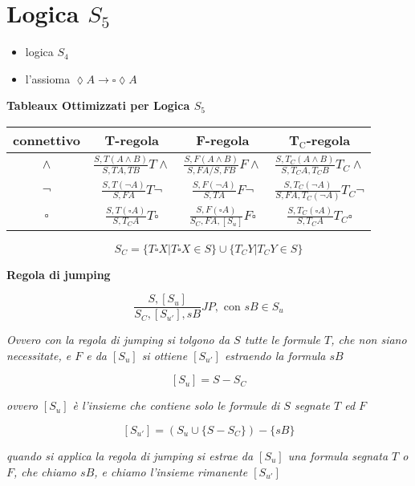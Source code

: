 \documentclass[a4paper,12pt, oneside]{book}
\begin{document}
\section*{Logica $S_5$}
\begin{itemize}
  \item logica $S_4$
  \item l'assioma $\lozenge A\to \square\lozenge A$
\end{itemize}
\begin{center}
  \textbf{Tableaux Ottimizzati per Logica $S_5$}
\end{center}
\begin{table}[H]
  \Large
  \centering
  \begin{tabular}{c||c|c|c}
    connettivo& T-regola& F-regola&T$_{\mbox{C}}$-regola\\
    \hline
    \hline
    $\land$ & $\frac{S,T(A\land B)}{S,TA,TB}T\land$&
                        $\frac{S,F(A\land B)}{S,FA/S,FB}F\land$&
                 $\frac{S,T_C(A\land B)}{S,T_CA,T_CB}T_C\land$\\
    \hline
    $\neg$ & $\frac{S,T(\neg A)}{S,FA}T\neg$&
                        $\frac{S,F(\neg A)}{S,TA}F\neg$&
         $\frac{S,T_C(\neg A)}{S,FA,T_C(\neg A)}T_C\neg$\\
    \hline
    $\square$ & $\frac{S,T(\square A)}{S,T_CA}T\square$&
             $\frac{S,F(\square A)}{S_C,FA,[S_u]}F\square$&
              $\frac{S,T_C(\square A)}{S,T_CA}T_C\square$\\
  \end{tabular}
\end{table}
\[S_C=\{T\square X|T\square X\in S\}\cup\{T_CY|T_CY\in S\}\]
\begin{center}
  \textbf{Regola di jumping}
\end{center}
\[\frac{S,[S_u]}{S_C,[S_{u'}],sB}JP,\mbox{ con }sB\in S_u\]
\begin{center}
  \textit{Ovvero con la regola di jumping si
    tolgono da $S$ tutte le formule $T$, che non siano necessitate, e $F$ e da
    $[S_u]$ si ottiene $[S_{u'}]$ estraendo la formula $sB$}
\end{center}
\[[S_u]=S-S_C\]
\begin{center}
  \textit{ovvero $[S_u]$ è l'insieme che contiene solo le formule di $S$ segnate
    $T$ ed $F$}  
\end{center}
\[[S_{u'}]=(S_u\cup\{S-S_C\})-\{sB\}\]
\begin{center}
  \textit{quando si applica la regola di jumping si estrae da $[S_u]$ una
    formula segnata $T$ o $F$, che chiamo $sB$, e chiamo l'insieme rimanente
    $[S_{u'}]$}
\end{center}
\end{document}
